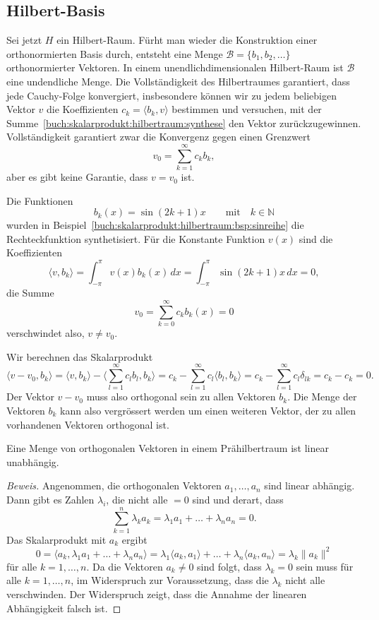 %
%
\subsection{Hilbert-Basis}
Sei jetzt $H$ ein Hilbert-Raum.
Fürht man wieder die Konstruktion einer orthonormierten Basis durch,
entsteht eine Menge $\mathcal{B}=\{b_1,b_2,\dots\}$ orthonormierter
Vektoren.
In einem unendlichdimensionalen Hilbert-Raum ist $\mathcal{B}$ eine
undendliche Menge.
Die Vollständigkeit des Hilbertraumes garantiert, dass jede
Cauchy-Folge konvergiert, insbesondere können wir zu jedem beliebigen
Vektor $v$ die Koeffizienten $c_k=\langle b_k,v \rangle$ bestimmen
und versuchen, mit der
Summe~\eqref{buch:skalarprodukt:hilbertraum:synthese}
den Vektor zurückzugewinnen.
Vollständigkeit garantiert zwar die Konvergenz gegen einen Grenzwert
\[
v_0 = \sum_{k=1}^\infty c_k b_k,
\]
aber es gibt keine Garantie, dass $v=v_0$ ist.

\begin{beispiel}
Die Funktionen
\[
b_k(x) = \sin (2k+1)x
\qquad\text{mit}\quad
k\in \mathbb{N}
\]
wurden in Beispiel~\ref{buch:skalarprodukt:hilbertraum:bsp:sinreihe}
die Rechteckfunktion synthetisiert.
Für die Konstante Funktion $v(x)$ sind die Koeffizienten
\[
\langle v,b_k\rangle
=
\int_{-\pi}^\pi v(x)b_k(x)\,dx
=
\int_{-\pi}^\pi \sin (2k+1)x\,dx
=
0,
\]
die Summe
\[
v_0
=
\sum_{k=0}^\infty
c_k
b_k(x)
=
0
\]
verschwindet also, $v\ne v_0$.
\end{beispiel}

Wir berechnen das Skalarprodukt 
\[
\langle v-v_0,b_k\rangle
=
\langle v,b_k\rangle
-
\biggl\langle \sum_{l=1}^\infty c_lb_l,b_k\biggr\rangle
=
c_k - \sum_{l=1}^\infty c_l\langle b_l,b_k\rangle
=
c_k - \sum_{l=1}^\infty c_l\delta_{lk}
=
c_k-c_k=0.
\]
Der Vektor $v-v_0$ muss also orthogonal sein zu allen Vektoren
$b_k$.
Die Menge der Vektoren $b_k$ kann also vergrössert werden um einen
weiteren Vektor, der zu allen vorhandenen Vektoren orthogonal ist.

\begin{satz}
Eine Menge von orthogonalen Vektoren in einem Prähilbertraum ist linear 
unabhängig.
\end{satz}

\begin{proof}[Beweis]
Angenommen, die orthogonalen Vektoren  $a_1,\dots,a_n$ sind linear
abhängig.
Dann gibt es Zahlen $\lambda_i$, die nicht alle $=0$ sind und derart,
dass
\[
\sum_{k=1}^n \lambda_ka_k
=
\lambda_1 a_1 + \ldots + \lambda_n a_n
=
0.
\]
Das Skalarprodukt mit $a_k$ ergibt
\[
0
=
\langle a_k,\lambda_1a_1 +\ldots + \lambda_na_n\rangle
=
\lambda_1
\langle a_k,a_1\rangle
+
\ldots
+
\lambda_n
\langle a_k,a_n\rangle
=
\lambda_k \|a_k\|^2
\]
für alle $k=1,\dots,n$.
Da die Vektoren $a_k\ne 0$ sind folgt, dass $\lambda_k=0$ sein muss
für alle $k=1,\dots,n$, im Widerspruch zur Voraussetzung, dass die
$\lambda_k$ nicht alle verschwinden.
Der Widerspruch zeigt, dass die Annahme der linearen Abhängigkeit
falsch ist.
\end{proof}

